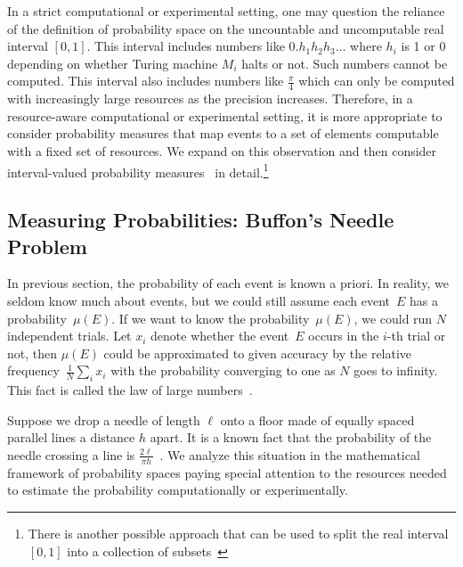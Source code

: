 \documentclass{article}
\theoremstyle{remark}
\newcommand{\pmeas}{\ensuremath{\mu}}
\newcommand{\yutsung}[1]{\fbox{\begin{minipage}{0.9\textwidth}\color{purple}{Yu-Tsung says: #1}\end{minipage}}}
\newcommand{\amr}[1]{\fbox{\begin{minipage}{0.9\textwidth}\color{green}{Amr says: #1}\end{minipage}}}
\begin{document}
In a strict computational or experimental setting, one may question
the reliance of the definition of probability space on the uncountable
and uncomputable real interval $[0,1]$. This interval includes numbers
like $0.h_1h_2h_3\ldots$ where $h_i$ is 1 or 0 depending on whether
Turing machine $M_i$ halts or not. Such numbers cannot be
computed. This interval also includes numbers like $\frac{\pi}{4}$
which can only be computed with increasingly large resources as the
precision increases.
Therefore, in a resource-aware computational or experimental setting,
it is more appropriate to consider probability measures that map
events to a set of elements computable with a fixed set of
resources. We expand on this observation and then consider
interval-valued probability
measures~\cite{Dempster1967,Shafer1976,JamisonLodwick2004}
in detail.\footnote{There is another possible approach that can be
  used to split the real interval $[0,1]$ into a collection of
  subsets~\cite{PuriRalescu1983} \amr{need to explain the
    connection and why we are not using it.}}

\subsection{Measuring Probabilities: Buffon's Needle
Problem\label{subsec:Measuring-Probabilities:-Buffon}}
 
In previous section, the probability of each event is known
a priori. In reality, we seldom know much about events, but we could still assume
each event~$E$ has a probability~$\pmeas(E)$. If we want to know the
probability~$\pmeas(E)$, we could run $N$ independent trials. Let $x_{i}$ denote
whether the event~$E$ occurs in the $i$-th trial or not, then $\pmeas(E)$ could
be approximated to given accuracy by the relative
frequency~$\frac{1}{N}\sum_{i}x_{i}$ with the probability converging to one as
$N$ goes to infinity. This fact is called the law of large
numbers~\cite{Bernoulli2006,Kolmogorov1950,Uspensky1937,Shafer1976,544199}.

Suppose we drop a needle of length $\ell$ onto a floor made of equally
spaced parallel lines a distance $h$ apart. It is a known fact that
the probability of the needle crossing a line is
$\frac{2\ell}{\pi h}$~\cite{Buffon1777,DeMorgan1872,Hall1873,Uspensky1937}.
We analyze this situation in the mathematical framework of probability
spaces paying special attention to the resources needed to estimate
the probability computationally or experimentally.
\end{document}
